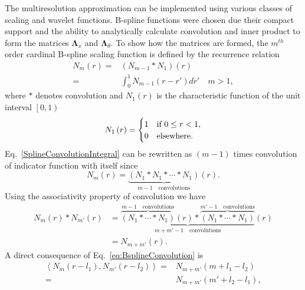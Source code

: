 \documentclass[journal,a4paper]{IEEEtran}
\begin{document}
The multiresolution approximation can be implemented using various classes of scaling and wavelet functions. B-spline functions were chosen due their compact support and the ability to analytically calculate convolution and inner product to form the matrices $ \boldsymbol\Lambda_x$ and $\boldsymbol \Lambda_{\theta}$. To show how the matrices are formed, the $m^{th}$ order cardinal B-spline scaling function is defined by the recurrence relation \cite{Chui1992} 
\begin{align}
N_{m}\left(r\right)=&\left(N_{m-1}\ast N_{1}\right)\left(r\right)\nonumber \\
=&\int_0^{1} N_{m-1}\left( r-r'\right)dr' \quad m>1,
\label{SplineConvolutionIntegral}
\end{align}
where $\ast$ denotes convolution and $N_1\left(r\right)$ is the characteristic function of the unit interval $\left[ 0,1\right)$
\begin{equation}
N_{1}\left(r\right)=
\begin{cases}
1 & \text{if $ 0\le r<1$}, \\
0 & \mathrm{elsewhere}.
\end{cases}
\end{equation}
Eq.~\ref{SplineConvolutionIntegral} can be rewritten as $(m-1)$ times convolution of indicator function with itself since
\begin{equation}
 N_{m}\left(r\right)=\underbrace{\left(N_{1}\ast N_{1}\ast \cdots \ast N_{1}\right)}_{m-1\quad \text{convolutions}}\left(r\right).
\end{equation}
Using the associativity property of convolution we have
\setlength{\arraycolsep}{0.0em}
\begin{align}\label{eq:BsplineConvolution}
N_{m}\left( r\right) \ast N_{m'}\left(r\right)&=\underbrace{\overbrace{\left(N_{1} \ast \cdots \ast N_{1}\right)}^{m-1 \quad \text{convolutions}}\left(r\right) \ast \overbrace{\left(N_{1} \ast \cdots \ast N_{1}\right)}^{m'-1\quad \text{convolutions}}}_{m+m'-1 \quad \text{convolutions}}\left(r\right)\nonumber\\
&=N_{m+m'}\left(r\right).
\end{align}
A direct consequence of Eq.~\eqref{eq:BsplineConvolution} is 
\begin{align}
 \left\langle N_{m}\left(r-l_{1}\right), N_{m'}\left(r-l_{2}\right)\right\rangle=&N_{m+m'}\left(m+l_{1}-l_{2}\right)\nonumber \\
=&N_{m+m'}\left(m'+l_{2}-l_{1}\right),
\label{eq:BsplineInnerProduct}
\end{align}
\end{document}
